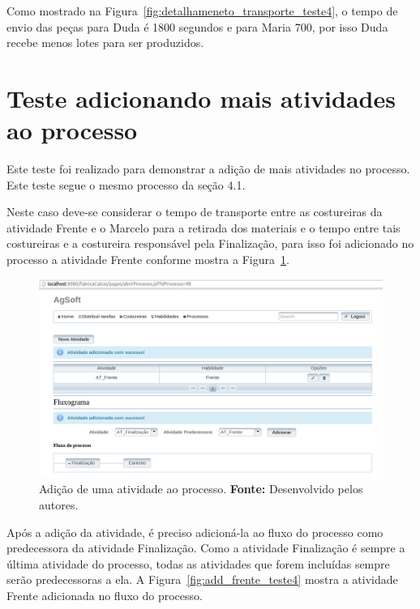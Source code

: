 \par Como mostrado na Figura~\ref{fig:detalhameneto_transporte_teste4}, o tempo
de envio das peças para Duda é 1800 segundos e para Maria 700, por isso
Duda recebe menos lotes para ser produzidos.


\section{Teste adicionando mais atividades ao processo}

\par Este teste foi realizado para demonstrar a adição de mais atividades no
processo. Este teste segue o mesmo processo da seção 4.1.

\par Neste caso deve-se considerar o tempo de transporte entre as costureiras da atividade Frente e o Marcelo 
para a retirada dos materiais e o tempo entre tais costureiras e a costureira
responsável pela Finalização, para isso foi adicionado no processo a atividade
Frente conforme mostra a Figura~\ref{fig:add_frente_teste5}.

\newpage

\begin{figure}[h!]
	\centerline{\includegraphics[scale=0.3]{./imagens/adiconar_atividade_frente_teste5.png}}
	\caption[Adição de uma atividade ao processo.]
	{Adição de uma atividade ao processo. \textbf{Fonte:} Desenvolvido pelos
	autores.}
	\label{fig:add_frente_teste5}
\end{figure}

\par Após a adição da atividade, é preciso adicioná-la ao fluxo do processo como
predecessora da atividade Finalização. Como a atividade Finalização é sempre a
última atividade do processo, todas as atividades que forem incluídas sempre
serão predecessoras a ela. A Figura~\ref{fig:add_frente_teste4} mostra a atividade Frente adicionada
no fluxo do processo.



